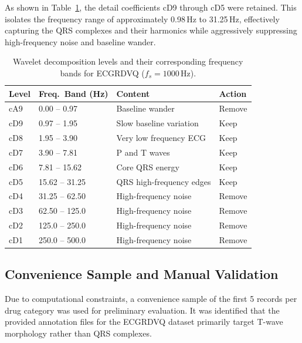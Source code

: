 \documentclass[11pt]{article}
\begin{document}
As shown in Table~\ref{tab:wavelet-1000}, the detail coefficients cD9 through cD5 were retained. This isolates the frequency range of approximately 0.98\,Hz to 31.25\,Hz, effectively capturing the QRS complexes and their harmonics while aggressively suppressing high-frequency noise and baseline wander.

\begin{table}[htbp]
    \centering
    \caption{Wavelet decomposition levels and their corresponding frequency bands for ECGRDVQ ($f_s = 1000$\,Hz).}
    \label{tab:wavelet-1000}
    \begin{tabular}{llll}
        \toprule
        \textbf{Level} & \textbf{Freq.\ Band (Hz)} & \textbf{Content} & \textbf{Action} \\
        \midrule
        cA9 & 0.00 -- 0.97   & Baseline wander & Remove \\
        cD9 & 0.97 -- 1.95   & Slow baseline variation & Keep \\
        cD8 & 1.95 -- 3.90   & Very low frequency ECG & Keep \\
        cD7 & 3.90 -- 7.81   & P and T waves & Keep \\
        cD6 & 7.81 -- 15.62  & Core QRS energy & Keep \\
        cD5 & 15.62 -- 31.25 & QRS high-frequency edges & Keep \\
        cD4 & 31.25 -- 62.50 & High-frequency noise & Remove \\
        cD3 & 62.50 -- 125.0 & High-frequency noise & Remove \\
        cD2 & 125.0 -- 250.0 & High-frequency noise & Remove \\
        cD1 & 250.0 -- 500.0 & High-frequency noise & Remove \\
        \bottomrule
    \end{tabular}
\end{table}



\subsection{Convenience Sample and Manual Validation}
Due to computational constraints, a convenience sample of the first 5 records per drug category was used for preliminary evaluation. It was identified that the provided annotation files for the ECGRDVQ dataset primarily target T-wave morphology rather than QRS complexes.

\end{document}
